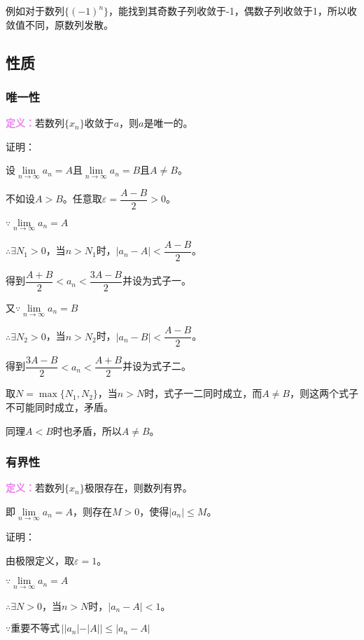 \documentclass[UTF8, 12pt]{ctexart}
\begin{document}
例如对于数列$\{(-1)^n\}$，能找到其奇数子列收敛于-1，偶数子列收敛于1，所以收敛值不同，原数列发散。

\subsection{性质}
\subsubsection{唯一性}

\textcolor{violet}{\textbf{定义：}}若数列$\{x_n\}$收敛于$a$，则$a$是唯一的。

证明：

设$\lim\limits_{n\to\infty}a_n=A$且$\lim\limits_{n\to\infty}a_n=B$且$A\neq B$。

不如设$A>B$。任意取$\varepsilon=\dfrac{A-B}{2}>0$。

$\because\lim\limits_{n\to\infty}a_n=A$

$\therefore\exists N_1>0$，当$n>N_1$时，$\vert a_n-A\vert<\dfrac{A-B}{2}$。

得到$\dfrac{A+B}{2}<a_n<\dfrac{3A-B}{2}$并设为式子一。

又$\because\lim\limits_{n\to\infty}a_n=B$

$\therefore\exists N_2>0$，当$n>N_2$时，$\vert a_n-B\vert<\dfrac{A-B}{2}$。

得到$\dfrac{3A-B}{2}<a_n<\dfrac{A+B}{2}$并设为式子二。

取$N=\max\{N_1,N_2\}$，当$n>N$时，式子一二同时成立，而$A\neq B$，则这两个式子不可能同时成立，矛盾。

同理$A<B$时也矛盾，所以$A\neq B$。

\subsubsection{有界性}

\textcolor{violet}{\textbf{定义：}}若数列$\{x_n\}$极限存在，则数列有界。

即$\lim\limits_{n\to\infty}a_n=A$，则存在$M>0$，使得$\vert a_n\vert\leqslant M$。

证明：

由极限定义，取$\varepsilon=1$。

$\because\lim\limits_{n\to\infty}a_n=A$

$\therefore\exists N>0$，当$n>N$时，$\vert a_n-A\vert<1$。

$\because\text{重要不等式}\,\vert\vert a_n\vert-\vert A\vert\vert\leqslant\vert a_n-A\vert$
\end{document}

